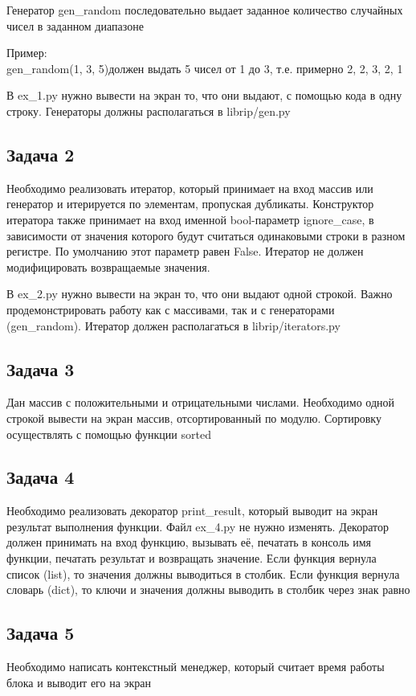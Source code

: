 \documentclass{article}
\begin{document}
Генератор gen\_random последовательно выдает заданное количество случайных чисел в заданном диапазоне

Пример: \\
gen\_random(1, 3, 5)должен выдать 5 чисел от 1 до 3, т.е. примерно 2, 2, 3, 2, 1

В ex\_1.py нужно вывести на экран то, что они выдают, с помощью кода в одну строку. Генераторы должны располагаться в librip/gen.py

\subsection{Задача 2}
Необходимо реализовать итератор, который принимает на вход массив или генератор и итерируется по элементам, пропуская дубликаты. Конструктор итератора также принимает на вход именной bool-параметр ignore\_case, в зависимости от значения которого будут считаться одинаковыми строки в разном регистре. По умолчанию этот параметр равен False. Итератор не должен модифицировать возвращаемые значения.

В ex\_2.py нужно вывести на экран то, что они выдают одной строкой. Важно продемонстрировать работу как с массивами, так и с генераторами (gen\_random).
Итератор должен располагаться в librip/iterators.py

\subsection{Задача 3}
Дан массив с положительными и отрицательными числами. Необходимо одной строкой вывести на экран массив, отсортированный по модулю. Сортировку осуществлять с помощью функции sorted

\subsection{Задача 4}
Необходимо реализовать декоратор print\_result, который выводит на экран результат выполнения функции. Файл ex\_4.py не нужно изменять.
Декоратор должен принимать на вход функцию, вызывать её, печатать в консоль имя функции, печатать результат и возвращать значение.
Если функция вернула список (list), то значения должны выводиться в столбик.
Если функция вернула словарь (dict), то ключи и значения должны выводить в столбик через знак равно

\subsection{Задача 5}
Необходимо написать контекстный менеджер, который считает время работы блока и выводит его на экран
\end{document}
